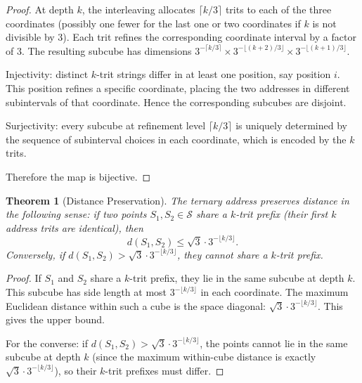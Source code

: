 \documentclass[11pt,twocolumn,a4paper]{article}
\newtheorem{theorem}{Theorem}[section]
\theoremstyle{definition}
\theoremstyle{remark}
\newcommand{\Sspace}{\mathcal{S}}
\begin{document}
\begin{proof}
At depth $k$, the interleaving allocates $\lceil k/3 \rceil$ trits to each of the three coordinates (possibly one fewer for the last one or two coordinates if $k$ is not divisible by 3). Each trit refines the corresponding coordinate interval by a factor of 3. The resulting subcube has dimensions $3^{-\lceil k/3 \rceil} \times 3^{-\lfloor (k+2)/3 \rfloor} \times 3^{-\lfloor (k+1)/3 \rfloor}$.

Injectivity: distinct $k$-trit strings differ in at least one position, say position $i$. This position refines a specific coordinate, placing the two addresses in different subintervals of that coordinate. Hence the corresponding subcubes are disjoint.

Surjectivity: every subcube at refinement level $\lceil k/3 \rceil$ is uniquely determined by the sequence of subinterval choices in each coordinate, which is encoded by the $k$ trits.

Therefore the map is bijective.
\end{proof}

\begin{theorem}[Distance Preservation]\label{thm:distance}
The ternary address preserves distance in the following sense: if two points $S_1, S_2 \in \Sspace$ share a $k$-trit prefix (their first $k$ address trits are identical), then
\begin{equation}\label{eq:distance-bound}
  d(S_1, S_2) \leq \sqrt{3} \cdot 3^{-\lfloor k/3 \rfloor}.
\end{equation}
Conversely, if $d(S_1, S_2) > \sqrt{3} \cdot 3^{-\lfloor k/3 \rfloor}$, they cannot share a $k$-trit prefix.
\end{theorem}

\begin{proof}
If $S_1$ and $S_2$ share a $k$-trit prefix, they lie in the same subcube at depth $k$. This subcube has side length at most $3^{-\lfloor k/3 \rfloor}$ in each coordinate. The maximum Euclidean distance within such a cube is the space diagonal: $\sqrt{3} \cdot 3^{-\lfloor k/3 \rfloor}$. This gives the upper bound.

For the converse: if $d(S_1, S_2) > \sqrt{3} \cdot 3^{-\lfloor k/3 \rfloor}$, the points cannot lie in the same subcube at depth $k$ (since the maximum within-cube distance is exactly $\sqrt{3} \cdot 3^{-\lfloor k/3 \rfloor}$), so their $k$-trit prefixes must differ.
\end{proof}
\end{document}

